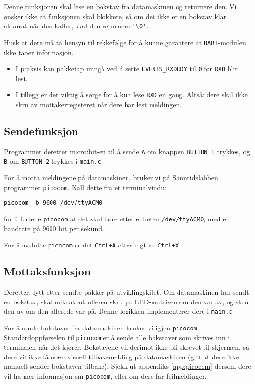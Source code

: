 Denne funksjonen skal lese en bokstav fra datamaskinen og returnere den. Vi ønsker ikke at funksjonen skal blokkere, så om det ikke er en bokstav klar akkurat når den kalles, skal den returnere \verb|'\0'|.

Husk at dere må ta hensyn til rekkefølge for å kunne garantere at \verb|UART|-modulen ikke taper informasjon.

\begin{itemize}
    \item I praksis kan pakketap unngå ved å sette \verb|EVENTS_RXDRDY| til \verb|0| før \verb|RXD| blir lest.
    \item I tillegg er det viktig å sørge for å kun lese \verb|RXD| en gang. Altså: dere skal ikke skru av mottakerregisteret når dere har lest meldingen.
\end{itemize}
\subsection{Sendefunksjon}
Programmer deretter micro:bit-en til å sende \verb|A| om knappen \verb|BUTTON 1| trykkes, og \verb|B| om \verb|BUTTON 2| trykkes i \verb|main.c|.

For å motta meldingene på datamaskinen, bruker vi på Sanntidslabben programmet \verb|picocom|. Kall dette fra et terminalvindu:

\verb|picocom -b 9600 /dev/ttyACM0|

for å fortelle \verb|picocom| at det skal høre etter enheten \verb|/dev/ttyACM0|, med en baudrate på 9600 bit per sekund.

For å avslutte \verb|picocom| er det \verb|Ctrl+A| etterfulgt av \verb|Ctrl+X|.

\subsection{Mottaksfunksjon}
Deretter, lytt etter sendte pakker på utviklingskitet. Om datamaskinen har sendt en bokstav, skal mikrokontrolleren skru på LED-matrisen om den var av, og skru den av om den allerede var på. Denne logikken implementerer dere i \verb|main.c|

For å sende bokstaver fra datamaskinen bruker vi igjen \verb|picocom|. Standardoppførselen til \verb|picocom| er å sende alle bokstaver som skrives inn i terminalen når det kjører. Bokstavene vil derimot ikke bli skrevet til skjermen, så dere vil ikke få noen visuell tilbakemelding på datamaskinen (gitt at dere ikke manuelt sender bokstaven tilbake). Sjekk ut appendiks \ref{app:picocom} dersom dere vil ha mer informasjon om \verb|picocom|, eller om dere får feilmeldinger.


